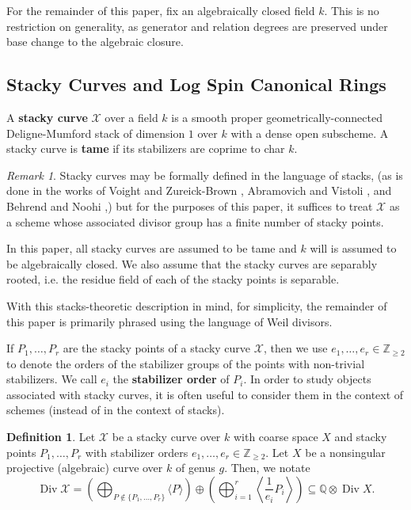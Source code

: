 \documentclass{amsart}
\theoremstyle{plain}
\theoremstyle{definition}
\newtheorem{defn}[thm]{Definition}
\theoremstyle{remark}
\newtheorem{rem}[thm]{Remark}
\numberwithin{equation}{section}
\newcommand\ssec{\subsection}
\newcommand\BQ{{\mathbb Q}}
\newcommand\BZ{{\mathbb Z}}
\DeclareMathOperator\di{Div}
\newcommand\sx{\mathscr X}
\begin{document}
For the remainder of this paper, fix an algebraically closed field $k$.
This is no restriction on generality, as generator and relation degrees are preserved under base change to the algebraic closure.

\ssec{Stacky Curves and Log Spin Canonical Rings}
\label{ssec:stacky-background}
A \textbf{stacky curve} $\sx$ over a field $k$ is a smooth proper
geometrically-connected Deligne-Mumford stack of dimension $1$ over
$k$ with a dense open subscheme. A stacky curve is \textbf{tame} if
its stabilizers are coprime to char $k$.

\begin{rem}
\label{rem:stack-formalism}
Stacky curves may be formally defined in the language of stacks, (as
is done in the works of Voight and Zureick-Brown \cite{vzb:stacky},
Abramovich and Vistoli \cite{abramovich-vistoli:compactifying}, and
Behrend and Noohi \cite{behrend-noohi:uniformization},) but for the
purposes of this paper, it suffices to treat $\sx$ as a scheme
whose associated divisor group has a finite number of stacky
points.

In this paper, all stacky curves are assumed to be tame and
$k$ will is assumed to be algebraically closed. We also assume that the
stacky curves are separably rooted, i.e. the residue field of each
of the stacky points is separable.

With this stacks-theoretic description in mind, for simplicity, the remainder of this paper is primarily phrased using the language
of Weil divisors.
\end{rem}

If $P_1, \ldots, P_r$ are the stacky points of a stacky curve $\sx$,
then we use $e_1, \ldots, e_r \in \BZ_{\geq 2}$ to denote the orders
of the stabilizer groups of the points with non-trivial
stabilizers. We call $e_i$ the \textbf{stabilizer order} of $P_i$.
In order to study objects associated with stacky curves, it is often
useful to consider them in the context of schemes (instead of in the context of stacks). 

\begin{defn}
\label{defn:coarse-space}
Let $\sx$ be a stacky curve over $k$ with coarse space $X$ and stacky points $P_1, \ldots,
P_r$ with stabilizer orders $e_1,\ldots, e_r \in \BZ_{\geq 2}$.
Let $X$ be a nonsingular projective (algebraic) curve over $k$ of
genus $g$. Then, we notate
\[
	\di \sx = \left(\bigoplus_{P\notin \{P_1,\ldots, P_r\}} \langle 
	P \rangle \right) \oplus \left(\bigoplus_{i = 1}^r \left \langle 
	\frac{1}{e_i}P_i \right \rangle \right) \subseteq \BQ \otimes \di X.
\]
\end{defn}
\end{document}
